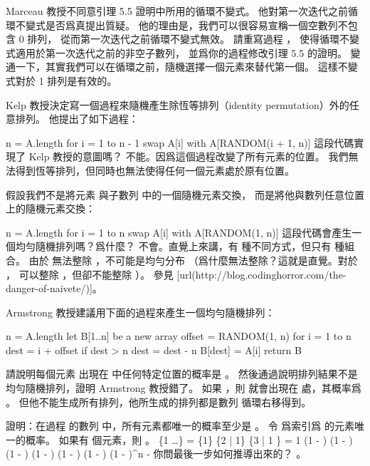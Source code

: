 \startsection[
  title={Randomized algorithms},
]

\startEXERCISE
Marceau 教授不同意引理 5.5 證明中所用的循環不變式。
他對第一次迭代之前循環不變式是否爲真提出質疑。
他的理由是，我們可以很容易宣稱一個空數列不包含 0 排列，
從而第一次迭代之前循環不變式無效。
請重寫過程 ，
使得循環不變式適用於第一次迭代之前的非空子數列，
並爲你的過程修改引理 5.5 的證明。
\stopEXERCISE
\startANSWER
變通一下，其實我們可以在循環之前，隨機選擇一個元素來替代第一個。
這樣不變式對於 1 排列是有效的。
\stopANSWER

\startEXERCISE
Kelp 教授決定寫一個過程來隨機產生除恆等排列（identity permutation）外的任意排列。
他提出了如下過程：

\startCLRS
n = A.length
for i = 1 to n - 1
	swap A[i] with A[RANDOM(i + 1, n)]
\stopCLRS
這段代碼實現了 Kelp 教授的意圖嗎？
\stopEXERCISE
\startANSWER
不能。因爲這個過程改變了所有元素的位置。
我們無法得到恆等排列，但同時也無法使得任何一個元素處於原有位置。
\stopANSWER

\startEXERCISE
假設我們不是將元素  與子數列  中的一個隨機元素交換，
而是將他與數列任意位置上的隨機元素交換：

\startCLRS
n = A.length
for i = 1 to n
	swap A[i] with A[RANDOM(1, n)]
\stopCLRS
這段代碼會產生一個均勻隨機排列嗎？爲什麼？
\stopEXERCISE
\startANSWER
不會。直覺上來講，有  種不同方式，但只有  種組合。
由於  無法整除 ，不可能是均勻分布
（爲什麼無法整除？這就是直覺。對於 ，  可以整除 ，但卻不能整除 ）。
參見 [url(http://blog.codinghorror.com/the-danger-of-naivete/)]。
\stopANSWER

\startEXERCISE
Armstrong 教授建議用下面的過程來產生一個均勻隨機排列：

\startCLRS
n = A.length
let B[1..n] be a new array
offset = RANDOM(1, n)
for i = 1 to n
	dest = i + offset
	if dest > n
		dest = dest - n
	B[dest] = A[i]
return B
\stopCLRS

請說明每個元素  出現在  中任何特定位置的概率是 。
然後通過說明排列結果不是均勻隨機排列，證明 Armstrong 教授錯了。
\stopEXERCISE
\startANSWER
如果 ，則  就會出現在  處，其概率爲 。
但他不能生成所有排列，他所生成的排列都是數列  循環右移得到。
\stopANSWER

\startEXERCISE \DIFFICULT
證明：在過程  的數列  中，所有元素都唯一的概率至少是 。
\stopEXERCISE
\startANSWER
令  爲索引爲  的元素唯一的概率。
如果有  個元素，則 。
\startformula\startmathalignment
\NC \Pr\{1   \cap \ldots\}
       \NC= \Pr\{1\} \cdot \Pr\{2 | 1\} \cdot \Pr\{3 | 1 \} \cdots \NR
\NC    \NC= 1 (1 - )
            (1 - )
            (1 - )
            \cdots \NR
\NC    \NC{} (1 - )
            (1 - )
            (1 - )
            \cdots \NR
\NC    \NC\ge (1 - )^n \NR
\NC    \NC{} -  \NR
\stopmathalignment\stopformula
你問最後一步如何推導出來的？ 。
\stopANSWER


